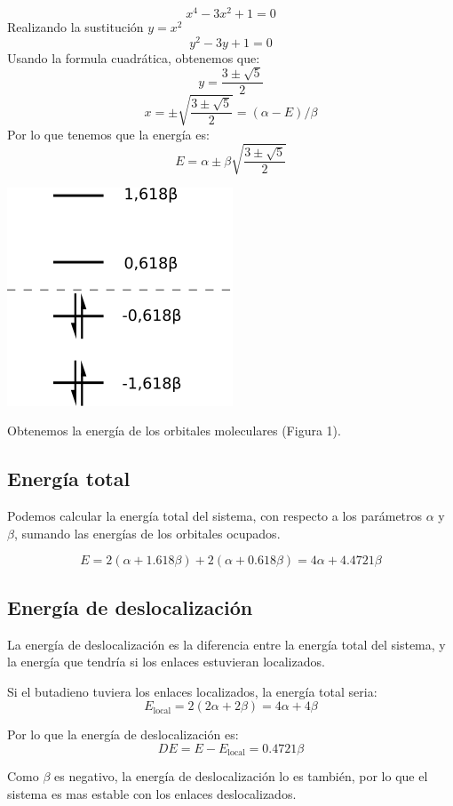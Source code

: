\documentclass[12pt]{article}
\begin{document}
\[
    x^4 - 3x^2 + 1 = 0
\]
Realizando la sustitución $y = x^2$
\[
    y^2 - 3y + 1 = 0
\]
Usando la formula cuadrática, obtenemos que:
\[
    y = \frac{3 \pm \sqrt{5}}{2}
\]
\[
    x = \pm \sqrt{\frac{3 \pm \sqrt{5}}{2}} = \left(\alpha - E\right)/\beta
\]
Por lo que tenemos que la energía es:
\[
    E = \alpha \pm \beta \sqrt{\frac{3 \pm \sqrt{5}}{2}}
\]


\begin{center}
    \includegraphics[height=0.24\textwidth]{butadiene_diagram.png}
\end{center}

Obtenemos la energía de los orbitales moleculares (Figura 1).






\subsection{Energía total}

Podemos calcular la energía total del sistema, con respecto a los parámetros $\alpha$ y $\beta$, sumando las energías de los orbitales ocupados.

\[E = 2 \left( \alpha + 1.618 \beta \right) + 2 \left( \alpha + 0.618 \beta \right) = 4 \alpha + 4.4721 \beta\]

\subsection{Energía de deslocalización}

La energía de deslocalización es la diferencia entre la energía total del sistema, y la energía que tendría si los enlaces estuvieran localizados.

Si el butadieno tuviera los enlaces localizados, la energía total seria:
\[E_{\text{local}} = 2 (2 \alpha + 2 \beta) = 4 \alpha + 4 \beta\]

Por lo que la energía de deslocalización es:
\[DE = E - E_{\text{local}} = 0.4721 \beta\]

Como $\beta$ es negativo, la energía de deslocalización lo es también, por lo que el sistema es mas estable con los enlaces deslocalizados.
\end{document}
